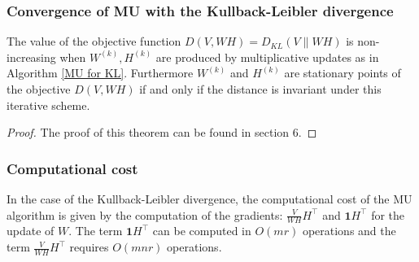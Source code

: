 \subsubsection{Convergence of MU with the Kullback-Leibler divergence}
\begin{theorem} \label{MU convergence KL}
    The value of the objective function $D(V, WH) = D_{KL}(V \| WH)$ is non-increasing when $W^{(k)}, H^{(k)}$ are produced by multiplicative updates as in Algorithm \ref{MU for KL}.
    Furthermore $W^{(k)}$ and $H^{(k)}$ are stationary points of the objective $D(V, WH)$ if and only if the distance is invariant under this iterative scheme.
\end{theorem}
\begin{proof}
    The proof of this theorem can be found in \cite{lee2000algorithms} section 6.
\end{proof}
\subsubsection{Computational cost}
In the case of the Kullback-Leibler divergence, the computational cost of the MU algorithm is given by the computation of the gradients: $\frac{V}{WH} H^\top$ and $\textbf{1} H^\top$ for the update of $W$.
The term $\textbf{1} H^\top$ can be computed in $O(mr)$ operations and the term $\frac{V}{WH} H^\top$ requires $O(mnr)$ operations.

